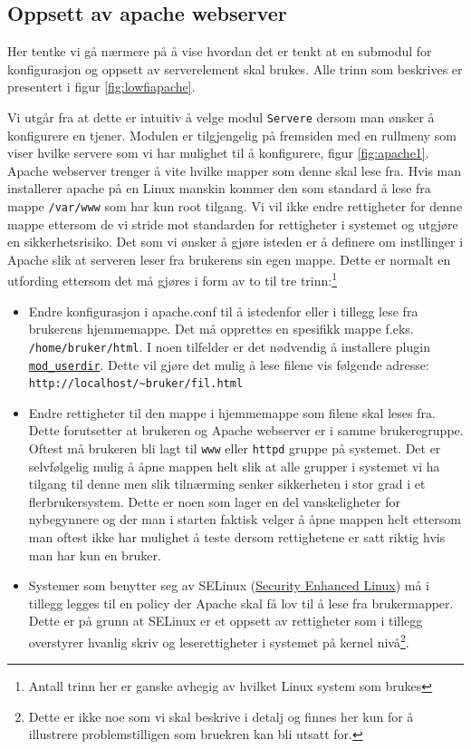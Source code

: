 \subsection{Oppsett av apache webserver}
Her tentke vi gå nærmere på å vise hvordan det er tenkt at en submodul for konfigurasjon og oppsett av serverelement skal brukes. Alle trinn som beskrives er presentert i figur \ref{fig:lowfiapache}.

Vi utgår fra at dette er intuitiv å velge modul \texttt{Servere} dersom man ønsker å konfigurere en tjener. Modulen er tilgjengelig på fremsiden med en rullmeny som viser hvilke servere som vi har mulighet til å konfigurere, figur \ref{fig:apache1}. 
Apache webserver trenger å vite hvilke mapper som denne skal lese fra. Hvis man installerer apache på en Linux manskin kommer den som standard å lese fra mappe \texttt{/var/www} som har kun root tilgang. Vi vil ikke endre rettigheter for denne mappe ettersom de vi stride mot standarden for rettigheter i systemet og utgjøre en sikkerhetsrisiko.\cite{book:unixprog}
Det som vi ønsker å gjøre isteden er å definere om instllinger i Apache slik at serveren leser fra brukerens sin egen mappe. Dette er normalt en utfording ettersom det må gjøres i form av to til tre trinn:\footnote{Antall trinn her er ganske avhegig av hvilket Linux system som brukes}

\begin{itemize}
\item Endre konfigurasjon i apache.conf til å istedenfor eller i tillegg lese fra brukerens hjemmemappe. Det må opprettes en spesifikk mappe f.eks. \texttt{/home/bruker/html}. 
I noen tilfelder er det nødvendig å installere plugin \href{http://httpd.apache.org/docs/2.2/mod/mod_userdir.html}{\texttt{mod\_{}userdir}}. Dette vil gjøre det mulig å lese filene vis følgende adresse: \texttt{http://localhost/\~{}bruker/fil.html}

\item Endre rettigheter til den mappe i hjemmemappe som filene skal leses fra. Dette forutsetter at brukeren og Apache webserver er i samme brukeregruppe. Oftest må brukeren bli lagt til \texttt{www} eller \texttt{httpd} gruppe på systemet. Det er selvfølgelig mulig å åpne mappen helt slik at alle grupper i systemet vi ha tilgang til denne men slik tilnærming senker sikkerheten i stor grad i et flerbrukersystem. Dette er noen som lager en del vanskeligheter for nybegynnere og der man i starten faktisk velger å åpne mappen helt ettersom man oftest ikke har mulighet å teste dersom rettighetene er satt riktig hvis man har kun en bruker.

\item Systemer som benytter seg av SELinux (\href{http://en.wikipedia.org/wiki/Security-Enhanced_Linux}{Security Enhanced Linux}) må i tillegg legges til en policy der Apache skal få lov til å lese fra brukermapper. Dette er på grunn at SELinux er et oppsett av rettigheter som i tillegg overstyrer hvanlig skriv og leserettigheter i systemet på kernel nivå\footnote{Dette er ikke noe som vi skal beskrive i detalj og finnes her kun for å illustrere problemstilligen som bruekren kan bli utsatt for.}. 
\end{itemize}

